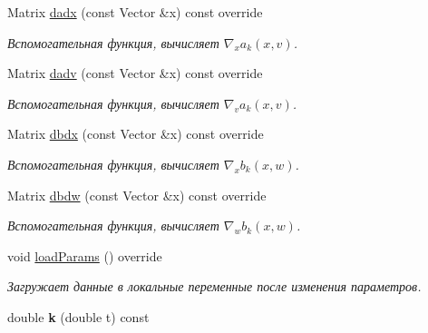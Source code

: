 \begin{DoxyCompactItemize}
\item 
\hypertarget{class_tasks_1_1_discrete_1_1_landing_linear_a8d1a37601f2184254e8ff8f97e026756}{}\label{class_tasks_1_1_discrete_1_1_landing_linear_a8d1a37601f2184254e8ff8f97e026756} 
Matrix \hyperlink{class_tasks_1_1_discrete_1_1_landing_linear_a8d1a37601f2184254e8ff8f97e026756}{dadx} (const Vector \&x) const override
\begin{DoxyCompactList}\small\item\em Вспомогательная функция, вычисляет $\nabla_x a_k(x,v)$. \end{DoxyCompactList}\item 
\hypertarget{class_tasks_1_1_discrete_1_1_landing_linear_aa72d305c7731e8972d99c04ef034ee22}{}\label{class_tasks_1_1_discrete_1_1_landing_linear_aa72d305c7731e8972d99c04ef034ee22} 
Matrix \hyperlink{class_tasks_1_1_discrete_1_1_landing_linear_aa72d305c7731e8972d99c04ef034ee22}{dadv} (const Vector \&x) const override
\begin{DoxyCompactList}\small\item\em Вспомогательная функция, вычисляет $\nabla_v a_k(x,v)$. \end{DoxyCompactList}\item 
\hypertarget{class_tasks_1_1_discrete_1_1_landing_linear_a7db5ae69d850f20d01efd665906b5b83}{}\label{class_tasks_1_1_discrete_1_1_landing_linear_a7db5ae69d850f20d01efd665906b5b83} 
Matrix \hyperlink{class_tasks_1_1_discrete_1_1_landing_linear_a7db5ae69d850f20d01efd665906b5b83}{dbdx} (const Vector \&x) const override
\begin{DoxyCompactList}\small\item\em Вспомогательная функция, вычисляет $\nabla_x b_k(x,w)$. \end{DoxyCompactList}\item 
\hypertarget{class_tasks_1_1_discrete_1_1_landing_linear_a25be613741f960811d693852d230a3eb}{}\label{class_tasks_1_1_discrete_1_1_landing_linear_a25be613741f960811d693852d230a3eb} 
Matrix \hyperlink{class_tasks_1_1_discrete_1_1_landing_linear_a25be613741f960811d693852d230a3eb}{dbdw} (const Vector \&x) const override
\begin{DoxyCompactList}\small\item\em Вспомогательная функция, вычисляет $\nabla_w b_k(x,w)$. \end{DoxyCompactList}\item 
\hypertarget{class_tasks_1_1_discrete_1_1_landing_linear_a955c4de6dbe0a71bc97d0bf39f695054}{}\label{class_tasks_1_1_discrete_1_1_landing_linear_a955c4de6dbe0a71bc97d0bf39f695054} 
void \hyperlink{class_tasks_1_1_discrete_1_1_landing_linear_a955c4de6dbe0a71bc97d0bf39f695054}{load\+Params} () override
\begin{DoxyCompactList}\small\item\em Загружает данные в локальные переменные после изменения параметров. \end{DoxyCompactList}\item 
\hypertarget{class_tasks_1_1_discrete_1_1_landing_linear_a8e641e61f366d3f4145a9b0c3b53b37e}{}\label{class_tasks_1_1_discrete_1_1_landing_linear_a8e641e61f366d3f4145a9b0c3b53b37e} 
double {\bfseries k} (double t) const
\end{DoxyCompactItemize}
